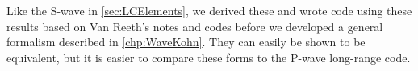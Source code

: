 \documentclass[Dissertation.tex]{subfiles}
\begin{document}
Like the S-wave in \cref{sec:LCElements}, we derived these and wrote code 
using these results based on Van Reeth's \cite{VanReethPrivate} notes and 
codes before we developed a general formalism described in \cref{chp:WaveKohn}.
They can easily be shown to be equivalent, but it is easier to compare these
forms to the P-wave long-range code.



%
%
\end{document}
